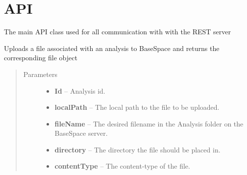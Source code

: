 \documentclass[letterpaper,10pt,english]{sphinxmanual}
\begin{document}
\section{API}
\label{Available modules:api}

\begin{fulllineitems}
\label{Available modules:BaseSpacePy.api.BaseSpaceAPI.BaseSpaceAPI}
The main API class used for all communication with with the REST server

\begin{fulllineitems}
\label{Available modules:BaseSpacePy.api.BaseSpaceAPI.BaseSpaceAPI.appResultFileUpload}
Uploads a file associated with an analysis to BaseSpace and returns the corresponding file object
\begin{quote}\begin{description}
\item[{Parameters}] \leavevmode\begin{itemize}
\item {} 
\textbf{Id} -- Analysis id.

\item {} 
\textbf{localPath} -- The local path to the file to be uploaded.

\item {} 
\textbf{fileName} -- The desired filename in the Analysis folder on the BaseSpace server.

\item {} 
\textbf{directory} -- The directory the file should be placed in.

\item {} 
\textbf{contentType} -- The content-type of the file.

\end{itemize}

\end{description}\end{quote}

\end{fulllineitems}


\end{fulllineitems}
\end{document}
